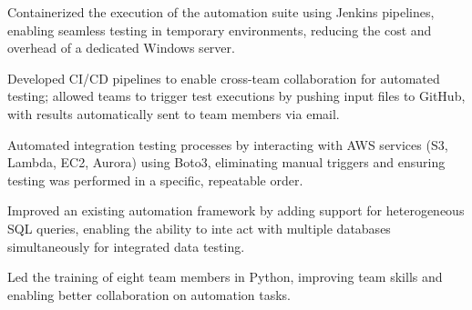 {
\item Containerized the execution of the automation suite using Jenkins pipelines, enabling seamless testing in temporary environments, reducing the cost and overhead of a dedicated Windows server.
\item Developed CI/CD pipelines to enable cross-team collaboration for automated testing; allowed teams to trigger test executions by pushing input files to GitHub, with results automatically sent to team members via email.
\item Automated integration testing processes by interacting with AWS services (S3, Lambda, EC2, Aurora) using Boto3, eliminating manual triggers and ensuring testing was performed in a specific, repeatable order.
\item Improved an existing automation framework by adding support for heterogeneous SQL queries, enabling the ability to inte act with multiple databases simultaneously for integrated data testing.
\item Led the training of eight team members in Python, improving team skills and enabling better collaboration on automation tasks.
}
